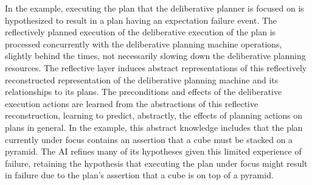 In the example, executing the plan that the deliberative planner is
focused on is hypothesized to result in a plan having an expectation
failure event.  The reflectively planned execution of the deliberative
execution of the plan is processed concurrently with the deliberative
planning machine operations, slightly behind the times, not
necessarily slowing down the deliberative planning resources.  The
reflective layer induces abstract representations of this reflectively
reconstructed representation of the deliberative planning machine and
its relationships to its plans.  The preconditions and effects of the
deliberative execution actions are learned from the abstractions of
this reflective reconstruction, learning to predict, abstractly, the
effects of planning actions on plans in general.  In the example, this
abstract knowledge includes that the plan currently under focus
contains an assertion that a cube must be stacked on a pyramid.  The
AI refines many of its hypotheses given this limited experience of
failure, retaining the hypothesis that executing the plan under focus
might result in failure due to the plan's assertion that a cube is on
top of a pyramid.

